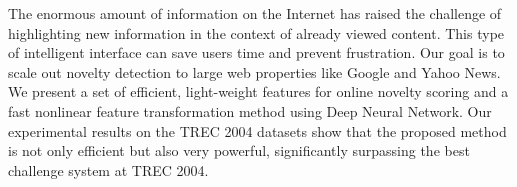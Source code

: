 The enormous amount of information on the Internet has raised the challenge of highlighting new information in the context of already viewed content. This type of intelligent interface can save users time and prevent frustration. Our goal is to scale out novelty detection to large web properties like Google and Yahoo News. We present a set of efficient, light-weight features for online novelty scoring and a fast nonlinear feature transformation method using Deep Neural Network. Our experimental results on the TREC 2004 datasets show that the proposed method is not only efficient but also very powerful, significantly surpassing the best challenge system at TREC 2004.
